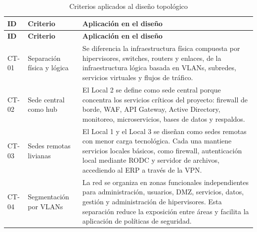 \documentclass[11pt, a4paper, oneside]{report}
\begin{document}
  \begin{xltabular}{\textwidth}{@{}|C{1.5cm}|L{3.5cm}|X|@{}}
  \caption{Criterios aplicados al diseño topológico}
  \label{tab:criterios_diseno_topologico} \\

  \parbox[c][1.1cm][c]{\linewidth}{\centering\color{white}\bfseries\small ID} &
  \parbox[c][1.1cm][c]{\linewidth}{\centering\color{white}\bfseries\small Criterio} &
  \parbox[c][1.1cm][c]{\linewidth}{\centering\color{white}\bfseries\small Aplicación en el diseño} \\ \hline
  \endfirsthead

  \parbox[c][1.1cm][c]{\linewidth}{\centering\color{white}\bfseries\small ID} &
  \parbox[c][1.1cm][c]{\linewidth}{\centering\color{white}\bfseries\small Criterio} &
  \parbox[c][1.1cm][c]{\linewidth}{\centering\color{white}\bfseries\small Aplicación en el diseño} \\ \hline
  \endhead

  \hline
  \endfoot
    
    {\small CT-01} & 
    {\small Separación física y lógica} & 
    {\small Se diferencia la infraestructura física compuesta por hipervisores, switches, routers y enlaces, de la infraestructura lógica basada en VLANs, subredes, servicios virtuales y flujos de tráfico.} \\ \hline 
    
    {\small CT-02} & 
    {\small Sede central como hub} & 
    {\small El Local 2 se define como sede central porque concentra los servicios críticos del proyecto: firewall de borde, WAF, API Gateway, Active Directory, monitoreo, microservicios, bases de datos y respaldos.} \\ \hline 

    {\small CT-03} & 
    {\small Sedes remotas livianas} & 
    {\small El Local 1 y el Local 3 se diseñan como sedes remotas con menor carga tecnológica. Cada una mantiene servicios locales básicos, como firewall, autenticación local mediante RODC y servidor de archivos, accediendo al ERP a través de la VPN.} \\ \hline 
    
    {\small CT-04} & 
    {\small Segmentación por VLANs} & 
    {\small La red se organiza en zonas funcionales independientes para administración, usuarios, DMZ, servicios, datos, gestión y administración de hipervisores. Esta separación reduce la exposición entre áreas y facilita la aplicación de políticas de seguridad.} \\ \hline 
    

\end{xltabular}
\end{document}
